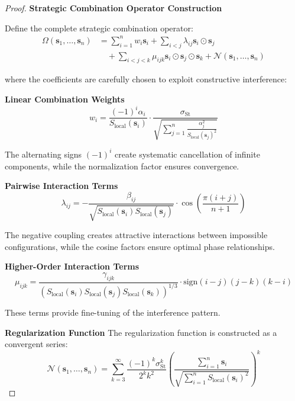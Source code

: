 \documentclass[11pt]{article}
\theoremstyle{definition}
\theoremstyle{remark}
\newcommand{\StellasConstant}{\sigma_{\text{St}}}
\begin{document}
\begin{proof}
\textbf{Strategic Combination Operator Construction}

Define the complete strategic combination operator:
\begin{align}
\Omega(\mathbf{s}_1, \ldots, \mathbf{s}_n) &= \sum_{i=1}^n w_i \mathbf{s}_i + \sum_{i<j} \lambda_{ij} \mathbf{s}_i \odot \mathbf{s}_j \\
&\quad + \sum_{i<j<k} \mu_{ijk} \mathbf{s}_i \odot \mathbf{s}_j \odot \mathbf{s}_k + \mathcal{N}(\mathbf{s}_1, \ldots, \mathbf{s}_n)
\end{align}

where the coefficients are carefully chosen to exploit constructive interference:

\textbf{Linear Combination Weights}
\begin{equation}
w_i = \frac{(-1)^i \alpha_i}{S_{\text{local}}(\mathbf{s}_i)} \cdot \frac{\StellasConstant}{\sqrt{\sum_{j=1}^n \frac{\alpha_j^2}{S_{\text{local}}(\mathbf{s}_j)^2}}}
\end{equation}

The alternating signs $(-1)^i$ create systematic cancellation of infinite components, while the normalization factor ensures convergence.

\textbf{Pairwise Interaction Terms}
\begin{equation}
\lambda_{ij} = -\frac{\beta_{ij}}{\sqrt{S_{\text{local}}(\mathbf{s}_i) S_{\text{local}}(\mathbf{s}_j)}} \cdot \cos\left(\frac{\pi(i+j)}{n+1}\right)
\end{equation}

The negative coupling creates attractive interactions between impossible configurations, while the cosine factors ensure optimal phase relationships.

\textbf{Higher-Order Interaction Terms}
\begin{equation}
\mu_{ijk} = \frac{\gamma_{ijk}}{(S_{\text{local}}(\mathbf{s}_i) S_{\text{local}}(\mathbf{s}_j) S_{\text{local}}(\mathbf{s}_k))^{1/3}} \cdot \text{sign}(i-j)(j-k)(k-i)
\end{equation}

These terms provide fine-tuning of the interference pattern.

\textbf{Regularization Function}
The regularization function is constructed as a convergent series:
\begin{equation}
\mathcal{N}(\mathbf{s}_1, \ldots, \mathbf{s}_n) = \sum_{k=3}^{\infty} \frac{(-1)^k \StellasConstant^k}{2^k k^2} \left(\frac{\sum_{i=1}^n \mathbf{s}_i}{\sqrt{\sum_{i=1}^n S_{\text{local}}(\mathbf{s}_i)^2}}\right)^k
\end{equation}


\end{proof}
\end{document}
